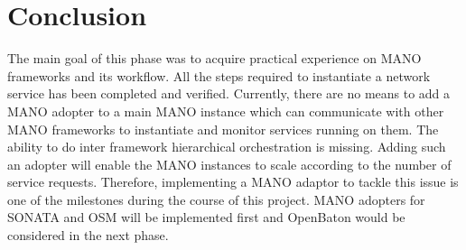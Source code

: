 \chapter{Conclusion}
\label{ch:Conclusion}

The main goal of this phase was to acquire practical experience on MANO frameworks and its workflow. All the steps required to instantiate a network service has been completed and verified. Currently, there are no means to add a MANO adopter to a main MANO instance which can communicate with other MANO frameworks to instantiate and monitor services running on them. The ability to do inter framework hierarchical orchestration is missing. Adding such an adopter will enable the MANO instances to scale according to the number of service requests. Therefore, implementing a MANO adaptor to tackle this issue is one of the milestones during the course of this project. MANO adopters for SONATA and OSM will be implemented first and OpenBaton would be considered in the next phase.


